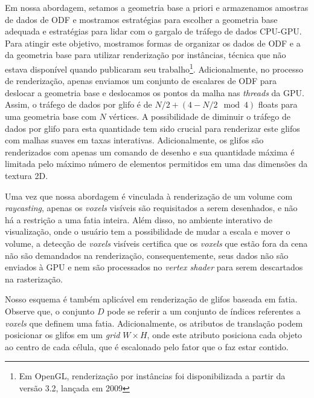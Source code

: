 \documentclass[
    12pt,                %
    oneside,            %
    a4paper,            %
    english,            %
    french,                %
    spanish,            %
    brazil                %
    ]{abntex2}
\begin{document}
Em nossa abordagem, setamos a geometria base a priori e armazenamos amostras de dados de ODF e mostramos estratégias para escolher a geometria base adequada e estratégias para lidar com o gargalo de tráfego de dados CPU-GPU. Para atingir este objetivo, mostramos formas de organizar os dados de ODF e a da geometria base para utilizar renderização por instâncias, técnica que não estava disponível quando  publicaram seu trabalho\footnote{Em OpenGL, renderização por instâncias foi disponibilizada a partir da versão 3.2, lançada em 2009}. Adicionalmente, no processo de renderização, apenas enviamos um conjunto de escalares de ODF para deslocar a geometria base e deslocamos os pontos da malha nas \textit{threads} da GPU. Assim, o tráfego de dados por glifo é de $N/2 + (4-N/2 \mod{4})$ floats para uma geometria base com $N$ vértices. A possibilidade de diminuir o tráfego de dados por glifo para esta quantidade tem sido crucial para renderizar este glifos com malhas suaves em taxas interativas. Adicionalmente, os glifos são renderizados com apenas um comando de desenho e sua quantidade máxima é limitada pelo máximo número de elementos permitidos em uma das dimensões da textura 2D.

Uma vez que nossa abordagem é vinculada à renderização de um volume com \textit{raycasting}, apenas os \textit{voxels} visíveis são requisitados a serem desenhados, e não há a restrição a uma fatia inteira. Além disso, no ambiente interativo de visualização, onde o usuário tem a possibilidade de mudar a escala e mover o volume, a detecção de \textit{voxels} visíveis certifica que os \textit{voxels} que estão fora da cena não são demandados na renderização, consequentemente, seus dados não são enviados à GPU e nem são processados no \textit{vertex shader} para serem descartados na rasterização.

Nosso esquema é também aplicável em renderização de glifos baseada em fatia. Observe que, o conjunto $D$ pode se referir a um conjunto de índices referentes a \textit{voxels} que definem uma fatia. Adicionalmente, os atributos de translação podem posicionar os glifos em um \textit{grid} $W \times H$, onde este atributo posiciona cada objeto ao centro de cada célula, que é escalonado pelo fator que o faz estar contido.

\end{document}

